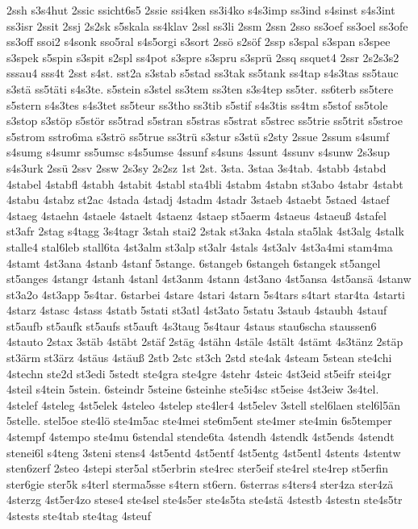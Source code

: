 {2ssh
s3s4hut
2ssic
ssicht6s5
2ssie
ssi4ken
ss3i4ko
s4s3imp
ss3ind
s4sinst
s4s3int
ss3isr
2ssit
2ssj
2s2sk
s5skala
ss4klav
2ssl
ss3li
2ssm
2ssn
2sso
ss3oef
ss3oel
ss3ofe
ss3off
ssoi2
s4sonk
sso5ral
s4s5orgi
s3sort
2ssö
s2söf
2ssp
s3spal
s3span
s3spee
s3spek
s5spin
s3spit
s2spl
ss4pot
s3spre
s3spru
s3sprü
2ssq
ssquet4
2ssr
2s2s3s2
sssau4
sss4t
2sst
s4st.
sst2a
s3stab
s5stad
ss3tak
ss5tank
ss4tap
s4s3tas
ss5tauc
s3stä
ss5täti
s4s3te.
s5stein
s3stel
ss3tem
ss3ten
s3s4tep
ss5ter.
ss6terb
ss5tere
s5stern
s4s3tes
s4s3tet
ss5teur
ss3tho
ss3tib
s5stif
s4s3tis
ss4tm
s5stof
ss5tole
s3stop
s3stöp
s5stör
ss5trad
s5stran
s5stras
s5strat
s5strec
ss5trie
ss5trit
s5stroe
s5strom
sstro6ma
s3strö
ss5true
ss3trü
s3stur
s3stü
s2sty
2ssue
2ssum
s4sumf
s4sumg
s4sumr
ss5umsc
s4s5umse
4ssunf
s4suns
4ssunt
4ssunv
s4sunw
2s3sup
s4s3urk
2ssü
2ssv
2ssw
2s3sy
2s2sz
1st
2st.
3sta.
3staa
3s4tab.
4stabb
4stabd
4stabel
4stabfl
4stabh
4stabit
4stabl
sta4bli
4stabm
4stabn
st3abo
4stabr
4stabt
4stabu
4stabz
st2ac
4stada
4stadj
4stadm
4stadr
3staeb
4staebt
5staed
4staef
4staeg
4staehn
4staele
4staelt
4staenz
4staep
st5aerm
4staeus
4staeuß
4stafel
st3afr
2stag
s4tagg
3s4tagr
3stah
stai2
2stak
st3aka
4stala
sta5lak
4st3alg
4stalk
stalle4
stal6leb
stall6ta
4st3alm
st3alp
st3alr
4stals
4st3alv
4st3a4mi
stam4ma
4stamt
4st3ana
4stanb
4stanf
5stange.
6stangeb
6stangeh
6stangek
st5angel
st5anges
4stangr
4stanh
4stanl
4st3anm
4stann
4st3ano
4st5ansa
4st5ansä
4stanw
st3a2o
4st3app
5s4tar.
6starbei
4stare
4stari
4starn
5s4tars
s4tart
star4ta
4starti
4starz
4stasc
4stass
4statb
5stati
st3atl
4st3ato
5statu
3staub
4staubh
4stauf
st5aufb
st5aufk
st5aufs
st5auft
4s3taug
5s4taur
4staus
stau6scha
staussen6
4stauto
2stax
3stäb
4stäbt
2stäf
2stäg
4stähn
4stäle
4stält
4stämt
4s3tänz
2stäp
st3ärm
st3ärz
4stäus
4stäuß
2stb
2stc
st3ch
2std
ste4ak
4steam
5stean
ste4chi
4stechn
ste2d
st3edi
5stedt
ste4gra
ste4gre
4stehr
4steic
4st3eid
st5eifr
stei4gr
4steil
s4tein
5stein.
6steindr
5steine
6steinhe
ste5i4sc
st5eise
4st3eiw
3s4tel.
4stelef
4steleg
4st5elek
4steleo
4stelep
ste4ler4
4st5elev
3stell
stel6laen
stel6l5än
5stelle.
stel5oe
ste4lö
ste4m5ac
ste4mei
ste6m5ent
ste4mer
ste4min
6s5temper
4stempf
4stempo
ste4mu
6stendal
stende6ta
4stendh
4stendk
4st5ends
4stendt
stenei6l
s4teng
3steni
stens4
4st5entd
4st5entf
4st5entg
4st5entl
4stents
4stentw
sten6zerf
2steo
4stepi
ster5al
st5erbrin
ste4rec
ster5eif
ste4rel
ste4rep
st5erfin
ster6gie
ster5k
s4terl
sterma5sse
s4tern
st6ern.
6sterras
s4ters4
ster4za
ster4zä
4sterzg
4st5er4zo
stese4
ste4sel
ste4s5er
ste4s5ta
ste4stä
4stestb
4stestn
ste4s5tr
4stests
ste4tab
ste4tag
4steuf
}
